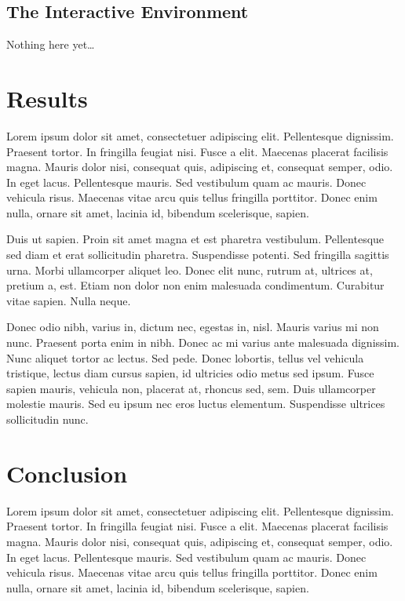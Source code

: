 \documentclass[11pt,letterpaper,onecolumn,twoside,openright,final]{report}
\begin{document}
\section{The Interactive Environment}
Nothing here yet\ldots


\chapter{Results}
Lorem ipsum dolor sit amet, consectetuer adipiscing elit. Pellentesque dignissim.
Praesent tortor.
In fringilla feugiat nisi.
Fusce a elit.
Maecenas placerat facilisis magna.
Mauris dolor nisi, consequat quis, adipiscing et, consequat semper, odio.
In eget lacus.
Pellentesque mauris.
Sed vestibulum quam ac mauris.
Donec vehicula risus.
Maecenas vitae arcu quis tellus fringilla porttitor.
Donec enim nulla, ornare sit amet, lacinia id, bibendum scelerisque, sapien.

Duis ut sapien.
Proin sit amet magna et est pharetra vestibulum.
Pellentesque sed diam et erat sollicitudin pharetra.
Suspendisse potenti.
Sed fringilla sagittis urna.
Morbi ullamcorper aliquet leo.
Donec elit nunc, rutrum at, ultrices at, pretium a, est.
Etiam non dolor non enim malesuada condimentum.
Curabitur vitae sapien.
Nulla neque.

Donec odio nibh, varius in, dictum nec, egestas in, nisl.
Mauris varius mi non nunc.
Praesent porta enim in nibh.
Donec ac mi varius ante malesuada dignissim.
Nunc aliquet tortor ac lectus.
Sed pede.
Donec lobortis, tellus vel vehicula tristique, lectus diam cursus sapien, id ultricies odio metus sed ipsum.
Fusce sapien mauris, vehicula non, placerat at, rhoncus sed, sem.
Duis ullamcorper molestie mauris.
Sed eu ipsum nec eros luctus elementum.
Suspendisse ultrices sollicitudin nunc.


\chapter{Conclusion}
Lorem ipsum dolor sit amet, consectetuer adipiscing elit. Pellentesque dignissim.
Praesent tortor.
In fringilla feugiat nisi.
Fusce a elit.
Maecenas placerat facilisis magna.
Mauris dolor nisi, consequat quis, adipiscing et, consequat semper, odio.
In eget lacus.
Pellentesque mauris.
Sed vestibulum quam ac mauris.
Donec vehicula risus.
Maecenas vitae arcu quis tellus fringilla porttitor.
Donec enim nulla, ornare sit amet, lacinia id, bibendum scelerisque, sapien.
\end{document}
